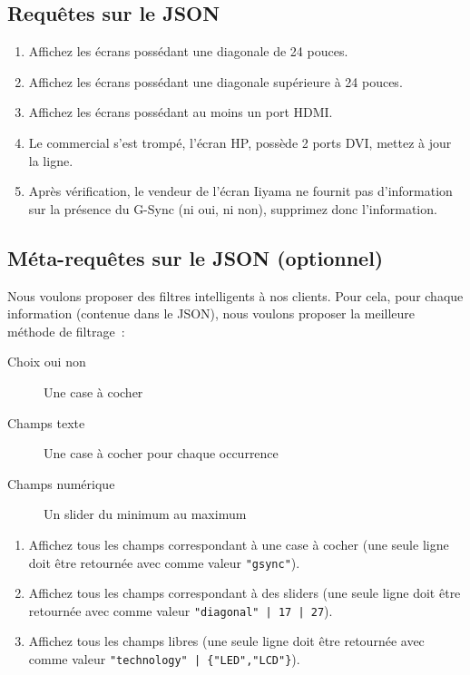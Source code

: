 \documentclass[a4paper,10pt]{article}
\begin{document}
  \subsection{Requêtes sur le JSON}
    \begin{enumerate}
      \item Affichez les écrans possédant une diagonale de 24 pouces.
      \item Affichez les écrans possédant une diagonale supérieure à 24 pouces.
      \item Affichez les écrans possédant au moins un port HDMI.
      \item Le commercial s'est trompé, l'écran HP, possède 2 ports DVI, mettez à jour la ligne.
      \item Après vérification, le vendeur de l'écran Iiyama ne fournit pas d'information sur la présence du G-Sync (ni oui, ni non), supprimez donc l'information.
    \end{enumerate}

  \subsection{Méta-requêtes sur le JSON (optionnel)}
    Nous voulons proposer des filtres intelligents à nos clients. Pour cela, pour chaque information (contenue dans le JSON), nous voulons proposer la meilleure méthode de filtrage :
    \begin{description}
        \item[Choix oui non] Une case à cocher
        \item[Champs texte] Une case à cocher pour chaque occurrence
        \item[Champs numérique] Un slider du minimum au maximum
   \end{description}

    \vspace{10px}

   \begin{enumerate}
     \item Affichez tous les champs correspondant à une case à cocher (une seule ligne doit être retournée avec comme valeur \texttt{"gsync"}).
     \item Affichez tous les champs correspondant à des sliders (une seule ligne doit être retournée avec comme valeur \texttt{"diagonal" |  17 |  27}).
     \item Affichez tous les champs libres (une seule ligne doit être retournée avec comme valeur \texttt{"technology" | \{"LED","LCD"\}}).
   \end{enumerate}
\end{document}
